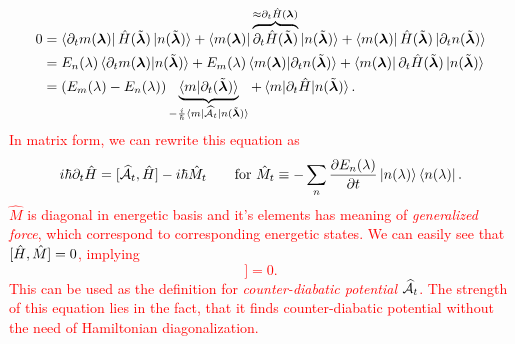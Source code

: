 \begin{equation}
    \begin{split}
        0&=\bra{\partial_t m(\llambda)}\HH(\tilde \llambda)\ket{n(\tilde\llambda)}+ \bra{m(\llambda)}\overbrace{\partial_t\HH(\tilde \llambda)}^{\approx \partial_t\HH(\llambda)}\ket{n(\tilde\llambda)}+ \bra{m(\llambda)}\HH(\tilde \llambda)\ket{\partial_t n(\tilde \llambda)}\\
        &=E_n(\lambda)\braket{\partial_t m(\llambda)|n(\tilde \llambda)} + E_m(\lambda)\braket{m(\llambda)|\partial_t n(\tilde \llambda)}+ \bra{m(\llambda)}\partial_t \HH(\tilde\llambda)\ket{n(\tilde \llambda)}\\
        &= (E_m(\lambda)-E_n(\lambda))\underbrace{\braket{m|\partial_t (\tilde \llambda)}}_{-\frac{i}{\hbar}\bra{m}\AA_t\ket{n(\tilde \llambda)}} + \braket{m|\partial_t\HH|n(\tilde \llambda)}.
    \end{split}
\end{equation}
\textcolor{red}{
In matrix form, we can rewrite this equation as
\begin{equation}
    i\hbar\partial_t\HH=[\AA_t,\HH]-i\hbar \hat{M}_t\qquad \text{for } \hat{M}_t\equiv -\sum_n\pder{E_n(\lambda)}{t}\ket{n(\lambda)}\bra{n(\lambda)}.
\end{equation}
$\hat{M}$ is diagonal in energetic basis and it's elements has meaning of \emph{generalized force}, which correspond to corresponding energetic states. We can easily see that $[\HH,\hat{M}]=0$, implying
\begin{equation}
    [\HH,i\hbar\partial_t\HH-[\AA_t,\HH]]=0.
    \label{eq:komutation}
\end{equation}
This can be used as the definition for \emph{counter-diabatic potential} $\AA_t$. The strength of this equation lies in the fact, that it finds counter-diabatic potential without the need of Hamiltonian diagonalization.}

